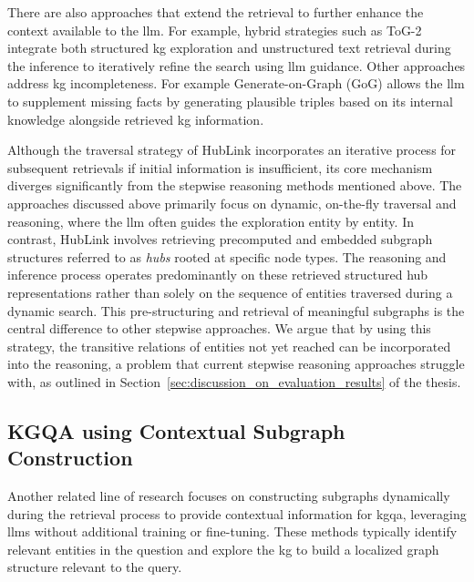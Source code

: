 There are also approaches that extend the retrieval to further enhance the context available to the \gls{llm}. For example, hybrid strategies such as ToG-2 \cite{ma_think--graph_2024} integrate both structured \gls{kg} exploration and unstructured text retrieval during the inference to iteratively refine the search using \gls{llm} guidance. Other approaches address \gls{kg} incompleteness. For example Generate-on-Graph (GoG) \cite{xu_generate--graph_2024} allows the \gls{llm} to supplement missing facts by generating plausible triples based on its internal knowledge alongside retrieved \gls{kg} information.

Although the traversal strategy of HubLink incorporates an iterative process for subsequent retrievals if initial information is insufficient, its core mechanism diverges significantly from the stepwise reasoning methods mentioned above. The approaches discussed above primarily focus on dynamic, on-the-fly traversal and reasoning, where the \gls{llm} often guides the exploration entity by entity. In contrast, HubLink involves retrieving precomputed and embedded subgraph structures referred to as \emph{hubs} rooted at specific node types. The reasoning and inference process operates predominantly on these retrieved structured hub representations rather than solely on the sequence of entities traversed during a dynamic search. This pre-structuring and retrieval of meaningful subgraphs is the central difference to other stepwise approaches. We argue that by using this strategy, the transitive relations of entities not yet reached can be incorporated into the reasoning, a problem that current stepwise reasoning approaches struggle with, as outlined in Section~\ref{sec:discussion_on_evaluation_results} of the thesis.

\subsection{KGQA using Contextual Subgraph Construction}
\label{sec:related_work_kgqa_subgraph_construction}

Another related line of research focuses on constructing subgraphs dynamically during the retrieval process to provide contextual information for \gls{kgqa}, leveraging \glspl{llm} without additional training or fine-tuning. These methods typically identify relevant entities in the question and explore the \gls{kg} to build a localized graph structure relevant to the query.

